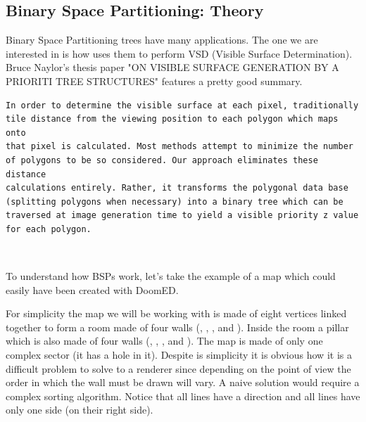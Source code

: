 \subsection{Binary Space Partitioning: Theory}
Binary Space Partitioning trees have many applications. The one we are interested in is how \doom uses them to perform VSD (Visible Surface Determination). Bruce Naylor's thesis paper "ON VISIBLE SURFACE GENERATION BY A PRIORITI TREE STRUCTURES" features a pretty good summary.\\

 \begin{verbatim}
In order to determine the visible surface at each pixel, traditionally
tile distance from the viewing position to each polygon which maps onto 
that pixel is calculated. Most methods attempt to minimize the number 
of polygons to be so considered. Our approach eliminates these distance
calculations entirely. Rather, it transforms the polygonal data base 
(splitting polygons when necessary) into a binary tree which can be 
traversed at image generation time to yield a visible priority z value
for each polygon.
\end{verbatim}

\par
{}\\
\par
To understand how BSPs work, let's take the example of a map which could easily have been created with DoomED.\\
\par
 For simplicity the map we will be working with is made of eight vertices linked together to form a room made of four walls (, , , and ). Inside the room a pillar which is also made of four walls (, , , and ). The map is made of only one complex sector (it has a hole in it). Despite is simplicity it is obvious how it is a difficult problem to solve to a renderer since depending on the point of view the order in which the wall must be drawn will vary. A naive solution would require a complex sorting algorithm. Notice that all lines have a direction and all lines have only one side (on their right side).\\

